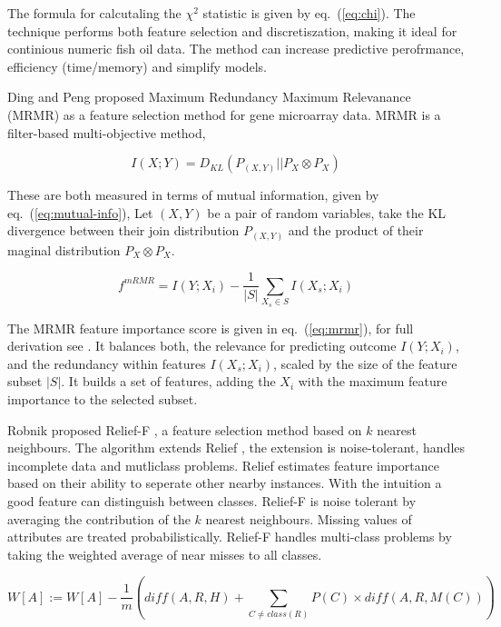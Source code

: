 \documentclass[runningheads]{llncs}
\begin{document}
The formula for calcutaling the $\chi^2$ statistic is given by eq.~(\ref{eq:chi}).
The technique performs both feature selection and discretiszation, making it ideal for continious numeric fish oil data. 
The method can increase predictive perofrmance, efficiency (time/memory) and simplify models. 

Ding and Peng proposed Maximum Redundancy Maximum Relevanance (MRMR) \cite{ding2005minimum} as a feature selection method for gene microarray data. 
MRMR is a filter-based multi-objective method, 

\begin{equation}
  I(X;Y) = D_{KL}(P_{(X,Y)} || P_X \otimes P_X) 
  \label{eq:mutual-info}
\end{equation}  

These are both measured in terms of mutual information, given by eq.~(\ref{eq:mutual-info}), 
Let $(X,Y)$ be a pair of random variables, take the KL divergence \cite{kullback1951information} between their join distribution $P_{(X,Y)}$ and the product of their maginal distribution $P_X \otimes P_X$.

\begin{equation}
  f^{mRMR} = I(Y;X_i) - \frac{1}{|S|} \sum_{X_s \in S} I(X_s;X_i) 
  \label{eq:mrmr}
\end{equation}  

The MRMR feature importance score is given in eq.~(\ref{eq:mrmr}), for full derivation see \cite{liu1995chi2,zhao2019maximum}.
It balances both, the relevance for predicting outcome $I(Y;X_i)$, and the redundancy within features $I(X_s;X_i)$, scaled by the size of the feature subset $|S|$. 
It builds a set of features, adding the $X_i$ with the maximum feature importance to the selected subset.

Robnik proposed Relief-F \cite{kononenko1994estimating}, a feature selection method based on $k$ nearest neighbours. 
The algorithm extends Relief \cite{kira1992practical}, the extension is noise-tolerant, handles incomplete data and mutliclass problems. 
Relief estimates feature importance based on their ability to seperate other nearby instances.
With the intuition a good feature can distinguish between classes. 
Relief-F is noise tolerant by averaging the contribution of the $k$ nearest neighbours. 
Missing values of attributes are treated probabilistically\cite{robnik2003theoretical}.
Relief-F handles multi-class problems by taking the weighted average of near misses to all classes.

\begin{equation}
  W[A] := W[A] - \frac{1}{m} \left( diff(A,R,H) +  \sum_{C \ne class(R)} P(C) \times diff(A,R,M(C)) \right)
  \label{eq:reliefF}
\end{equation}
\end{document}
